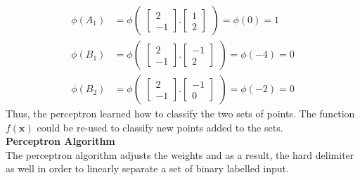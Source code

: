 \begin{align*}
  \phi(A_1) &= \phi\begin{pmatrix}
    \begin{bmatrix}
      2\\
      -1
    \end{bmatrix}.\begin{bmatrix}
      1 \\
      2
    \end{bmatrix}
  \end{pmatrix} = \phi(0) = 1 \\
  \phi(B_1) &= \phi\begin{pmatrix}
    \begin{bmatrix}
      2\\
      -1
    \end{bmatrix}.\begin{bmatrix}
      -1 \\
      2
    \end{bmatrix}
  \end{pmatrix} = \phi(-4) = 0 \\
  \phi(B_2) &= \phi\begin{pmatrix}
    \begin{bmatrix}
      2\\
      -1
    \end{bmatrix}.\begin{bmatrix}
      -1 \\
      0
    \end{bmatrix}
  \end{pmatrix} = \phi(-2) = 0
\end{align*}
Thus, the perceptron learned how to classify the two sets of points. The function $f(\textbf{x})$ could be re-used to classify new points added to the sets.
\vspace{5mm}
\\
\noindent\textbf{Perceptron Algorithm}\\
The perceptron algorithm adjusts the weights and as a result, the hard delimiter as well in order to linearly separate a set of binary labelled input.

